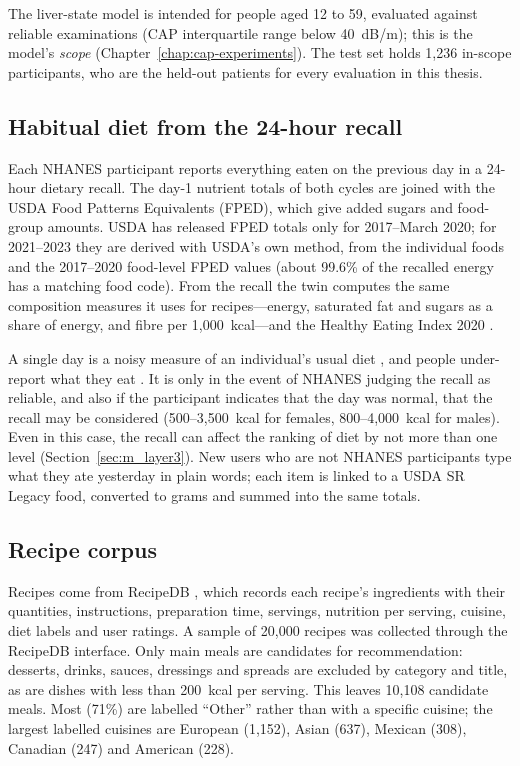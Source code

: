 The liver-state model is intended for people aged 12 to 59, evaluated against
reliable examinations (CAP interquartile range below 40~dB/m); this is the
model's \emph{scope} (Chapter~\ref{chap:cap-experiments}). The test set holds
1{,}236 in-scope participants, who are the held-out patients for every
evaluation in this thesis.

\subsection{Habitual diet from the 24-hour recall}

Each NHANES participant reports everything eaten on the previous day in a
24-hour dietary recall. The day-1 nutrient totals of both cycles are joined
with the USDA Food Patterns Equivalents (FPED), which give added sugars and
food-group amounts. USDA has released FPED totals only for 2017--March 2020;
for 2021--2023 they are derived with USDA's own method, from the individual
foods and the 2017--2020 food-level FPED values (about 99.6\% of the
recalled energy has a matching food code). From the recall the twin computes
the same composition measures it uses for recipes---energy, saturated fat and
sugars as a share of energy, and fibre per 1{,}000~kcal---and the Healthy
Eating Index 2020 \cite{shamswhite2023hei}.

A single day is a noisy measure of an individual's usual diet
\cite{dodd2006usual}, and people under-report what they eat
\cite{subar2003open}. It is only in the event of NHANES judging the recall as reliable, 
and also if the participant indicates that the day was normal, 
that the recall may be considered (500--3{,}500~kcal for females, 800--4{,}000~kcal for males). Even in this case, 
the recall can affect the ranking of diet by not more than one level 
(Section~\ref{sec:m_layer3}). New users who are not NHANES participants type
what they ate yesterday in plain words; each item is linked to a USDA SR
Legacy food, converted to grams and summed into the same totals.

\subsection{Recipe corpus}

Recipes come from RecipeDB \cite{batra2020recipedb}, which records each
recipe's ingredients with their quantities, instructions, preparation time,
servings, nutrition per serving, cuisine, diet labels and user ratings. A
sample of 20{,}000 recipes was collected through the RecipeDB interface. Only
main meals are candidates for recommendation: desserts, drinks, sauces,
dressings and spreads are excluded by category and title, as are dishes with
less than 200~kcal per serving. This leaves 10{,}108 candidate meals. Most
(71\%) are labelled ``Other'' rather than with a specific cuisine; the
largest labelled cuisines are European (1{,}152), Asian (637), Mexican (308),
Canadian (247) and American (228).

